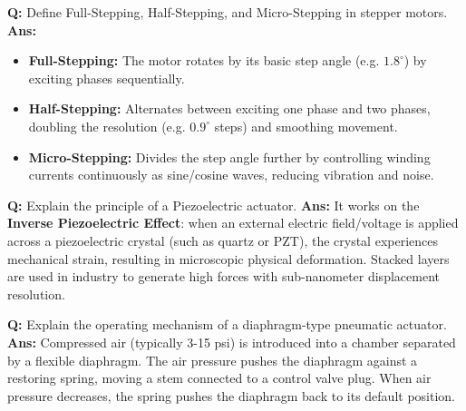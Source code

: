 \documentclass[10pt,a4paper,twocolumn]{article}
\begin{document}
\begin{tcolorbox}[
  colback=white,
  colframe=UnitColorOne,
  colbacktitle=gray!10!white,
  coltitle=black,
  fonttitle=\bfseries\sffamily\small,
  title={Unit I $\bullet$ Card 9: Stepper Motor Stepping Modes},
  boxrule=1.2pt,
  arc=2mm,
  outer arc=2mm,
  boxsep=1.5mm,
  top=1mm,
  bottom=1mm,
  left=1.5mm,
  right=1.5mm,
  before skip=2.5mm,
  after skip=2.5mm
]
\textbf{Q:} Define Full-Stepping, Half-Stepping, and Micro-Stepping in stepper motors.
\tcbline
\textbf{Ans:} \begin{itemize}
  \item   \textbf{Full-Stepping:} The motor rotates by its basic step angle (e.g. $1.8^\circ$) by exciting phases sequentially.
  \item   \textbf{Half-Stepping:} Alternates between exciting one phase and two phases, doubling the resolution (e.g. $0.9^\circ$ steps) and smoothing movement.
  \item   \textbf{Micro-Stepping:} Divides the step angle further by controlling winding currents continuously as sine/cosine waves, reducing vibration and noise.
\end{itemize}
\end{tcolorbox}


\begin{tcolorbox}[
  colback=white,
  colframe=UnitColorOne,
  colbacktitle=gray!10!white,
  coltitle=black,
  fonttitle=\bfseries\sffamily\small,
  title={Unit I $\bullet$ Card 10: Piezoelectric Actuator},
  boxrule=1.2pt,
  arc=2mm,
  outer arc=2mm,
  boxsep=1.5mm,
  top=1mm,
  bottom=1mm,
  left=1.5mm,
  right=1.5mm,
  before skip=2.5mm,
  after skip=2.5mm
]
\textbf{Q:} Explain the principle of a Piezoelectric actuator.
\tcbline
\textbf{Ans:} It works on the \textbf{Inverse Piezoelectric Effect}: when an external electric field/voltage is applied across a piezoelectric crystal (such as quartz or PZT), the crystal experiences mechanical strain, resulting in microscopic physical deformation. Stacked layers are used in industry to generate high forces with sub-nanometer displacement resolution.
\end{tcolorbox}


\begin{tcolorbox}[
  colback=white,
  colframe=UnitColorOne,
  colbacktitle=gray!10!white,
  coltitle=black,
  fonttitle=\bfseries\sffamily\small,
  title={Unit I $\bullet$ Card 11: Pneumatic Actuator},
  boxrule=1.2pt,
  arc=2mm,
  outer arc=2mm,
  boxsep=1.5mm,
  top=1mm,
  bottom=1mm,
  left=1.5mm,
  right=1.5mm,
  before skip=2.5mm,
  after skip=2.5mm
]
\textbf{Q:} Explain the operating mechanism of a diaphragm-type pneumatic actuator.
\tcbline
\textbf{Ans:} Compressed air (typically 3-15 psi) is introduced into a chamber separated by a flexible diaphragm. The air pressure pushes the diaphragm against a restoring spring, moving a stem connected to a control valve plug. When air pressure decreases, the spring pushes the diaphragm back to its default position.
\end{tcolorbox}
\end{document}
